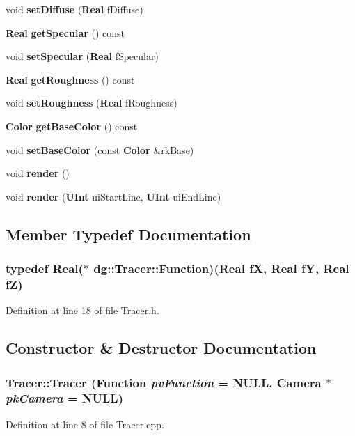 \begin{CompactItemize}
\item 
void {\bf set\-Diffuse} ({\bf Real} f\-Diffuse)
\item 
{\bf Real} {\bf get\-Specular} () const
\item 
void {\bf set\-Specular} ({\bf Real} f\-Specular)
\item 
{\bf Real} {\bf get\-Roughness} () const
\item 
void {\bf set\-Roughness} ({\bf Real} f\-Roughness)
\item 
{\bf Color} {\bf get\-Base\-Color} () const
\item 
void {\bf set\-Base\-Color} (const {\bf Color} \&rk\-Base)
\item 
void {\bf render} ()
\item 
void {\bf render} ({\bf UInt} ui\-Start\-Line, {\bf UInt} ui\-End\-Line)
\end{CompactItemize}


\subsection{Member Typedef Documentation}
\subsubsection{\setlength{\rightskip}{0pt plus 5cm}typedef {\bf Real}($\ast$ dg::Tracer::Function)({\bf Real} f\-X, {\bf Real} f\-Y, {\bf Real} f\-Z)}\label{classdg_1_1Tracer_s0}




Definition at line 18 of file Tracer.h.

\subsection{Constructor \& Destructor Documentation}
\subsubsection{\setlength{\rightskip}{0pt plus 5cm}Tracer::Tracer ({\bf Function} {\em pv\-Function} = NULL, {\bf Camera} $\ast$ {\em pk\-Camera} = NULL)}\label{classdg_1_1Tracer_a0}




Definition at line 8 of file Tracer.cpp.
